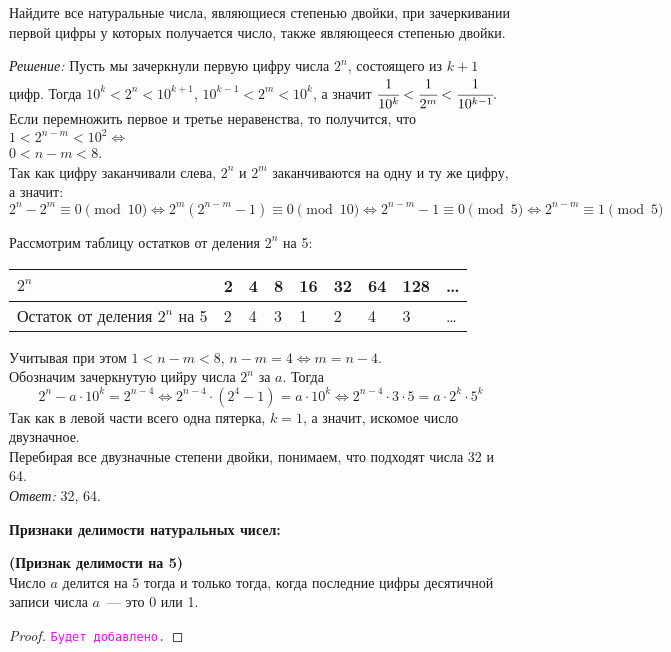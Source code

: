 \documentclass[11pt]{article}
\begin{document}
\begin{example}
	Найдите все натуральные числа, являющиеся степенью двойки, при зачеркивании первой цифры у которых получается число, также являющееся степенью двойки.
\end{example}
\textit{Решение:}
Пусть мы зачеркнули первую цифру числа $2^n$, состоящего из $k + 1$ цифр. Тогда  $10^k < 2^n < 10^{k + 1}$, $10^{k - 1} < 2^m < 10^k$, а значит $\cfrac{1}{10^k} < \cfrac{1}{2^m} < \cfrac{1}{10^{k - 1}}.$\\
Если перемножить первое и третье неравенства, то получится, что $1 < 2^{n - m} < 10^{2} \Longleftrightarrow$\\ $0 < n - m < 8$.\\
Так как цифру заканчивали слева, $2^n$ и $2^m$ заканчиваются на одну и ту же цифру, а значит:\\
\[2^n - 2^m \equiv 0 \pmod{10} \Leftrightarrow 2^m(2^{n - m} - 1) \equiv 0 \pmod{10} \Leftrightarrow
2^{n - m} - 1 \equiv 0 \pmod 5 \Leftrightarrow 2^{n - m} \equiv 1 \pmod 5 \]

Рассмотрим таблицу остатков от деления $2^n$ на 5:

\begin{center}
\begin{tabular}{ | l | l | l | l | l | l | l | l | l |}
\hline
$2^n$ & 2 & 4 & 8 & 16 & 32 & 64 & 128 & \ldots \\ \hline
Остаток от деления $2^n$ на 5   & 2 & 4 & 3 & 1 & 2 & 4 & 3 & \ldots\\\hline
\end{tabular}
\end{center}

Учитывая при этом $1 < n - m < 8 $, $n - m = 4 \Leftrightarrow m = n - 4$.\\
Обозначим зачеркнутую цийру числа $2^n$ за $a$. Тогда
\[2^n - a \cdot 10^k = 2^{n - 4} \Leftrightarrow
2^{n - 4} \cdot (2^{4} - 1) = a \cdot 10^k \Leftrightarrow
2^{n - 4} \cdot 3 \cdot 5 = a \cdot 2^k \cdot 5^k \]
Так как в левой части всего одна пятерка, $k = 1$, а значит, искомое число двузначное.\\
Перебирая все двузначные степени двойки, понимаем, что подходят числа 32 и 64.\\
\textit{Ответ:} 32, 64.

\textbf{Признаки делимости натуральных чисел:}

\begin{theorem} \textbf{(Признак делимости на 5)}\\
	Число $a$ делится на $5$ тогда и только тогда, когда последние цифры десятичной записи числа $a$~--- это 0 или 1.
\end{theorem}
\begin{proof}
    \textcolor{magenta}{\texttt{Будет добавлено.}}
\end{proof}
\end{document}
